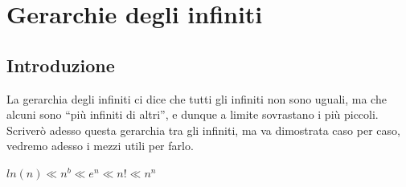 \documentclass{article}
\theoremstyle{definition}
\newcommand{\virgolette}[1]{``#1''}
\begin{document}
\section{Gerarchie degli infiniti}
\subsection{Introduzione}
La gerarchia degli infiniti ci dice che tutti gli infiniti non sono uguali, ma che alcuni sono \virgolette{più infiniti di altri}, e dunque a limite sovrastano i più piccoli.
\\
Scriverò adesso questa gerarchia tra gli infiniti, ma va dimostrata caso per caso, vedremo adesso i mezzi utili per farlo.
\begin{center}
    $ln(n) \ll n^b \ll e^n \ll n! \ll n^n $
\end{center}
\end{document}
